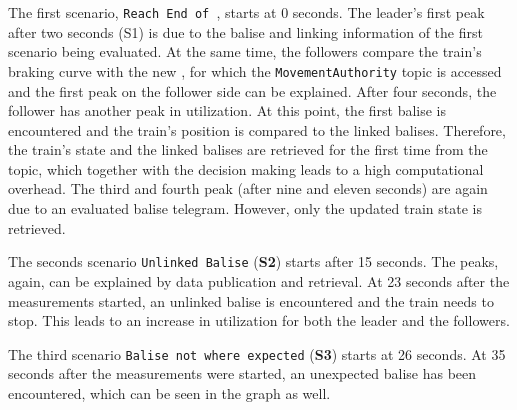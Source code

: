 The first scenario, \texttt{Reach End of }, starts at 0 seconds.
The leader's first peak after two seconds (S1) is due to the balise and linking information of the first scenario being evaluated.
At the same time, the followers compare the train's braking curve with the new , for which the \texttt{MovementAuthority} topic is accessed and the first peak on the follower side can be explained.
After four seconds, the follower has another peak in  utilization.
At this point, the first balise is encountered and the train's position is compared to the linked balises.
Therefore, the train's state and the linked balises are retrieved for the first time from the topic, which together with the decision making leads to a high computational overhead.
The third and fourth peak (after nine and eleven seconds) are again due to an evaluated balise telegram.
However, only the updated train state is retrieved.

The seconds scenario \texttt{Unlinked Balise} (\textbf{S2}) starts after 15 seconds.
The peaks, again, can be explained by data publication and retrieval.
At 23 seconds after the measurements started, an unlinked balise is encountered and the train needs to stop.
This leads to an increase in  utilization for both the leader and the followers.

The third scenario \texttt{Balise not where expected} (\textbf{S3}) starts at 26 seconds.
At 35 seconds after the measurements were started, an unexpected balise has been encountered, which can be seen in the graph as well.

